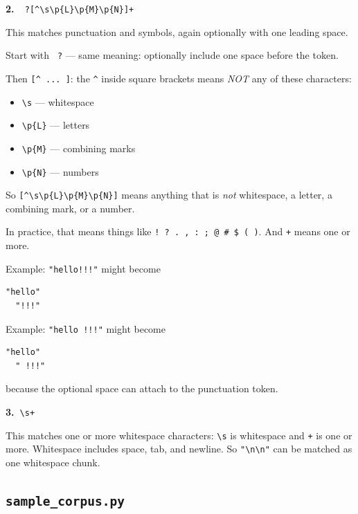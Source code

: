 \noindent\textbf{2.\ }\verb| ?[^\s\p{L}\p{M}\p{N}]+|

This matches punctuation and symbols, again optionally with one leading
space.

Start with \verb| ?| --- same meaning: optionally include one space
before the token.

Then \verb|[^ ... ]|: the \texttt{\textasciicircum} inside
square brackets means \emph{NOT} any of these characters:

\begin{itemize}
    \setlength{\itemsep}{0pt}
    \item \verb|\s| --- whitespace
    \item \verb|\p{L}| --- letters
    \item \verb|\p{M}| --- combining marks
    \item \verb|\p{N}| --- numbers
\end{itemize}

So \verb|[^\s\p{L}\p{M}\p{N}]| means anything that is \emph{not} whitespace, a
letter, a combining mark, or a number.

In practice, that means things like
\texttt{! ? . , : ; @ \# \$ ( )}. And \texttt{+} means one or more.

Example: \texttt{"hello!!!"} might become
\begin{lstlisting}[style=shadedpython,breaklines=true]
  "hello"
  "!!!"
\end{lstlisting}
Example: \texttt{"hello !!!"} might become
\begin{lstlisting}[style=shadedpython,breaklines=true]
  "hello"
  " !!!"
\end{lstlisting}
because the optional space can attach to the punctuation token.

\noindent\textbf{3.\ }\verb|\s+|

This matches one or more whitespace characters: \verb|\s| is whitespace and
\texttt{+} is one or more. Whitespace includes space, tab, and newline. So
\texttt{"\textbackslash n\textbackslash n"} can be matched as one whitespace
chunk.

\subsection{\texttt{sample\_corpus.py}}

